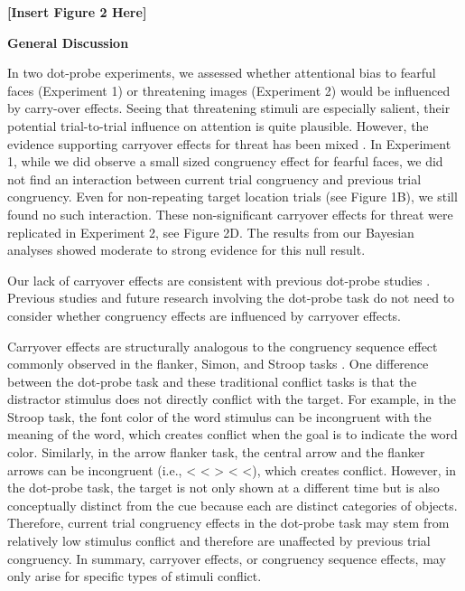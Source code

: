 \documentclass{article}
\begin{document}
\textbf{[Insert Figure 2 Here]}

\textbf{General Discussion}

In two dot-probe experiments, we assessed whether attentional bias to fearful faces (Experiment 1) or threatening images (Experiment 2) would be influenced by carry-over effects. Seeing that threatening stimuli are especially salient, their potential trial-to-trial influence on attention is quite plausible. However, the evidence supporting carryover effects for threat has been mixed \parencite{Gladwin2019}\parencite{Hill2016}. In Experiment 1, while we did observe a small sized congruency effect for fearful faces, we did not find an interaction between current trial congruency and previous trial congruency. Even for non-repeating target location trials (see Figure 1B), we still found no such interaction. These non-significant carryover effects for threat were replicated in Experiment 2, see Figure 2D. The results from our Bayesian analyses showed moderate to strong evidence for this null result. 

Our lack of carryover effects are consistent with previous dot-probe studies \parencite{Gladwin2017}\parencite{Hill2016}\parencite{Hill2016}\parencite{Hill2016}. Previous studies and future research involving the dot-probe task do not need to consider whether congruency effects are influenced by carryover effects.

Carryover effects are structurally analogous to the congruency sequence effect commonly observed in the flanker, Simon, and Stroop tasks \parencite{Duthoo2014}. One difference between the dot-probe task and these traditional conflict tasks is that the distractor stimulus does not directly conflict with the target. For example, in the Stroop task, the font color of the word stimulus can be incongruent with the meaning of the word, which creates conflict when the goal is to indicate the word color. Similarly, in the arrow flanker task, the central arrow and the flanker arrows can be incongruent (i.e., < < > < <), which creates conflict. However, in the dot-probe task, the target is not only shown at a different time but is also conceptually distinct from the cue because each are distinct categories of objects. Therefore, current trial congruency effects in the dot-probe task may stem from relatively low stimulus conflict and therefore are unaffected by previous trial congruency. In summary, carryover effects, or congruency sequence effects, may only arise for specific types of stimuli conflict.
\end{document}

